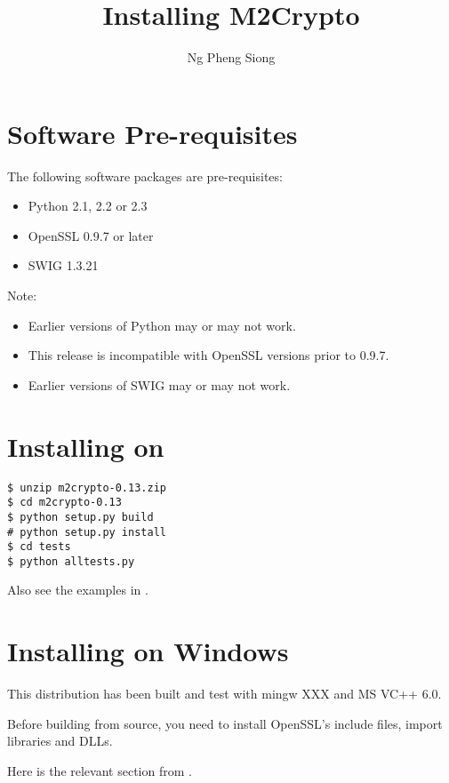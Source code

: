 \documentclass{howto}
\title{Installing M2Crypto}
\author{Ng Pheng Siong}
\begin{document}
\maketitle

\section{Software Pre-requisites}

The following software packages are pre-requisites:    

\begin{itemize}
  \item  Python 2.1, 2.2 or 2.3
  \item  OpenSSL 0.9.7 or later
  \item  SWIG 1.3.21
\end{itemize}

\begin{notice}
Note:
\begin{itemize}
  \item  Earlier versions of Python may or may not work.
  \item  This release is incompatible with OpenSSL versions prior to 0.9.7.
  \item  Earlier versions of SWIG may or may not work.
\end{itemize}
\end{notice}

\section{Installing on \UNIX}

\begin{verbatim}
$ unzip m2crypto-0.13.zip
$ cd m2crypto-0.13
$ python setup.py build
# python setup.py install
$ cd tests
$ python alltests.py
\end{verbatim}

Also see the examples in .

\section{Installing on Windows}

This distribution has been built and test with mingw XXX and MS VC++
6.0.

Before building from source, you need to install OpenSSL's include files,
import libraries and DLLs.

Here is the relevant section from .
\end{document}
